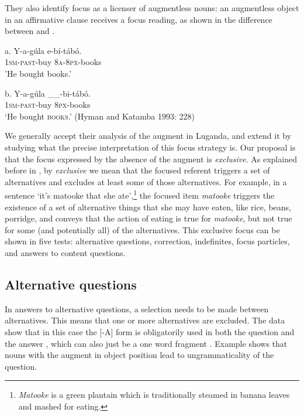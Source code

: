 \documentclass[output=paper]{langsci/langscibook}
\begin{document}
They also identify focus as a licenser of augmentless nouns: an augmentless object in an affirmative clause receives a focus reading, as shown in the difference between  and .

\ea
\gll a.  Y-a-gúla    e-bí-tábó.\\
       \textsc{1sm}-\textsc{past}-buy  \textsc{8a}-\textsc{8px}-books\\
\glt   'He bought books.'
\z

\ea
\gll b.  Y-a-gúla    \_\_-bi-tábó.\\
       \textsc{1sm}-\textsc{past}-buy       \textsc{8px}-books\\
\glt   ‘He bought \textsc{books}.’ (Hyman and Katamba 1993: 228)
\z

We generally accept their analysis of the augment in Luganda, and extend it by studying what the precise interpretation of this focus strategy is. Our proposal is that the focus expressed by the absence of the augment is \textit{exclusive}. As explained before in , by \textit{exclusive} we mean that the focused referent triggers a set of alternatives and excludes at least some of those alternatives. For example, in a sentence ‘it’s matooke that she ate’,\footnote{\textit{Matooke} is a green plantain which is traditionally steamed in banana leaves and mashed for eating. } {} the focused item \textit{matooke} triggers the existence of a set of alternative things that she may have eaten, like rice, beans, porridge, and conveys that the action of eating is true for \textit{matooke}, but not true for some (and potentially all) of the alternatives. This exclusive focus can be shown in five tests: alternative questions, correction, indefinites, focus particles, and answers to content questions.

\subsection{Alternative questions} %

In answers to alternative questions, a selection needs to be made between alternatives. This means that one or more alternatives are excluded. The data show that in this case the [-A] form is obligatorily used in both the question  and the answer , which can also just be a one word fragment . Example  shows that nouns with the augment in object position lead to ungrammaticality of the question. 
\end{document}
